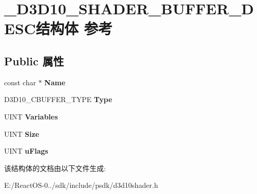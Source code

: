 \hypertarget{struct___d3_d10___s_h_a_d_e_r___b_u_f_f_e_r___d_e_s_c}{}\section{\+\_\+\+D3\+D10\+\_\+\+S\+H\+A\+D\+E\+R\+\_\+\+B\+U\+F\+F\+E\+R\+\_\+\+D\+E\+S\+C结构体 参考}
\label{struct___d3_d10___s_h_a_d_e_r___b_u_f_f_e_r___d_e_s_c}
\subsection*{Public 属性}
\begin{DoxyCompactItemize}
\item 
\mbox{\label{struct___d3_d10___s_h_a_d_e_r___b_u_f_f_e_r___d_e_s_c_a9596616bee9c905721c2b4df891c29ae}} 
const char $\ast$ {\bfseries Name}
\item 
\mbox{\label{struct___d3_d10___s_h_a_d_e_r___b_u_f_f_e_r___d_e_s_c_a59219f6b8cfb0acba5083dee0c2c6886}} 
D3\+D10\+\_\+\+C\+B\+U\+F\+F\+E\+R\+\_\+\+T\+Y\+PE {\bfseries Type}
\item 
\mbox{\label{struct___d3_d10___s_h_a_d_e_r___b_u_f_f_e_r___d_e_s_c_a5348a3b04b9574422cb5f251cb4bfb05}} 
U\+I\+NT {\bfseries Variables}
\item 
\mbox{\label{struct___d3_d10___s_h_a_d_e_r___b_u_f_f_e_r___d_e_s_c_acfbb3c45f72e7320160cd8afd250d861}} 
U\+I\+NT {\bfseries Size}
\item 
\mbox{\label{struct___d3_d10___s_h_a_d_e_r___b_u_f_f_e_r___d_e_s_c_a738c43274105b51533517ffdcfef8137}} 
U\+I\+NT {\bfseries u\+Flags}
\end{DoxyCompactItemize}


该结构体的文档由以下文件生成\+:\begin{DoxyCompactItemize}
\item 
E\+:/\+React\+O\+S-\/0../sdk/include/psdk/d3d10shader.\+h\end{DoxyCompactItemize}
